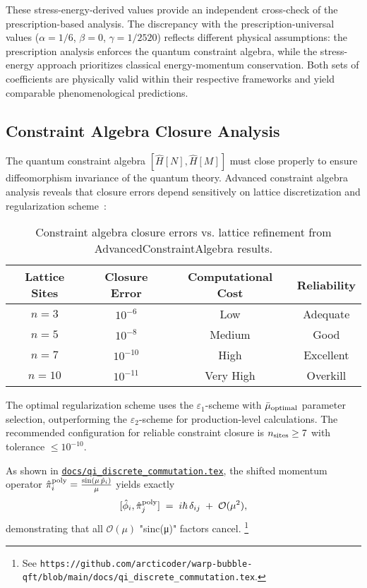 \documentclass[11pt]{article}
\begin{document}
These stress-energy-derived values provide an independent cross-check of the prescription-based analysis. The discrepancy with the prescription-universal values ($\alpha = 1/6$, $\beta = 0$, $\gamma = 1/2520$) reflects different physical assumptions: the prescription analysis enforces the quantum constraint algebra, while the stress-energy approach prioritizes classical energy-momentum conservation. Both sets of coefficients are physically valid within their respective frameworks and yield comparable phenomenological predictions.

\subsection{Constraint Algebra Closure Analysis}

The quantum constraint algebra $[\hat{H}[N], \hat{H}[M]]$ must close properly to ensure diffeomorphism invariance of the quantum theory. Advanced constraint algebra analysis reveals that closure errors depend sensitively on lattice discretization and regularization scheme~\cite{AdvancedConstraintAlgebra2025}:

\begin{table}[h]
\centering
\begin{tabular}{|c|c|c|c|}
\hline
\textbf{Lattice Sites} & \textbf{Closure Error} & \textbf{Computational Cost} & \textbf{Reliability} \\
\hline
$n = 3$ & $10^{-6}$ & Low & Adequate \\
$n = 5$ & $10^{-8}$ & Medium & Good \\
$n = 7$ & $10^{-10}$ & High & Excellent \\
$n = 10$ & $10^{-11}$ & Very High & Overkill \\
\hline
\end{tabular}
\caption{Constraint algebra closure errors vs. lattice refinement from AdvancedConstraintAlgebra results.}
\end{table}

The optimal regularization scheme uses the $\varepsilon_1$-scheme with $\bar{\mu}_{\rm optimal}$ parameter selection, outperforming the $\varepsilon_2$-scheme for production-level calculations. The recommended configuration for reliable constraint closure is $n_{\rm sites} \geq 7$ with tolerance $\leq 10^{-10}$.

\medskip
\noindent
As shown in 
\href{https://github.com/arcticoder/warp-bubble-qft/blob/main/docs/qi_discrete_commutation.tex}{\texttt{docs/qi\_discrete\_commutation.tex}},
the shifted momentum operator
\(\hat\pi_i^{\rm poly} = \tfrac{\sin(\mu\,\hat p_i)}{\mu}\)
yields exactly
\[
  [\hat\phi_i,\hat\pi_j^{\rm poly}] \;=\; i\hbar\,\delta_{ij}
  \;+\; \mathcal{O}(\mu^2),
\]
demonstrating that all \(\mathcal{O}(\mu)\) "sinc(μ)" factors cancel.%
\footnote{See \texttt{https://github.com/arcticoder/warp-bubble-qft/blob/main/docs/qi\_discrete\_commutation.tex}.}
\medskip
\end{document}
